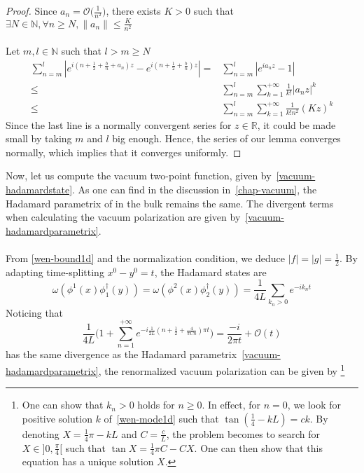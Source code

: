 \begin{proof}
Since $a_n = \mathcal{O}\big(\frac{1}{n^2}\big)$, 
there exists $ K > 0$ such that $ \exists N \in\mathbb{N}, \forall n\geq N, \| a_n\| \leq \frac{K}{n^2}$ \\\\
Let $m,l\in\mathbb{N}$ such that $l > m \geq N$
\begin{equation*}
\begin{split}
\sum_{n=m}^{l}  | e^{i(n + \frac 1 2+\frac{b}{n}+a_n)z } - e^{i(n+\frac 1 2+\frac{b}{n})z } | = & 
\sum_{n=m}^{l} | e^{ia_n z} - 1 | \\
%
\leq & \sum_{n=m}^{l}\sum_{k=1}^{+\infty}\frac{1}{k!}| a_n z |^k \\
%
\leq & \sum_{n=m}^l \sum_{k=1}^{+\infty}\frac{1}{k!n^2}(Kz)^k
\end{split}
\end{equation*}
Since the last line is a normally convergent series for $z \in \mathbb{R}$, it could be made small by taking $m$ and $l$ big enough.
Hence, the series of our lemma converges normally, which implies that it converges uniformly.
\end{proof}
Now, let us compute the vacuum two-point function, given by~\cref{vacuum-hadamardstate}.
As one can find in the discussion in~\cref{chap-vacuum}, the Hadamard parametrix of in the bulk remains the same. 
The divergent terms when calculating the vacuum polarization are given by~\cref{vacuum-hadamardparametrix}. \\\\
From \cref{wen-bound1d} and the normalization condition, we deduce $|f| = |g| = \frac 1 2$.
By adapting time-splitting $x^0 - y^0 = t$, the Hadamard states are
\begin{equation*}
\omega(\phi^1(x)\phi^\dagger_1(y)) = \omega(\phi^2(x)\phi^\dagger_2(y)) = 
\frac{1}{4L}\sum_{k_n>0} e^{-ik_nt}
\end{equation*} 
Noticing that 
\begin{equation*}
\frac{ 1}{ 4L}\Big(1+\sum_{n=1}^{+\infty} e^{-i\frac{1}{2L}(n+\frac 1 2 + \frac{4}{\pi C n} ) \pi t} \Big)
= \frac{-i}{2\pi t} + \mathcal{O}(t)
\end{equation*}
has the same divergence as the Hadamard parametrix~\cref{vacuum-hadamardparametrix}, the renormalized vacuum polarization can be given by
\footnote{
One can show that $k_n > 0$ holds for $n \geq 0$. In effect, for $n = 0$, we look for positive solution $k$ of~\cref{wen-mode1d} such that $\tan(\frac 1 4 - kL) = ck$. By denoting $X = \frac 1 4 \pi - kL$ and $C = \frac c L$, the problem becomes to search for $X \in ] 0, \frac \pi 4[$ such that $\tan X = \frac 1 4 \pi C - C X$. One can then show that this equation has a unique solution $X$.
}

